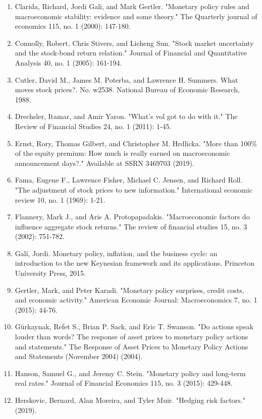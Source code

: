 \documentclass[12pt]{article}
\begin{document}
\begin{enumerate}
    \item{Clarida, Richard, Jordi Gali, and Mark Gertler. "Monetary policy rules and macroeconomic stability: evidence and some theory." The Quarterly journal of economics 115, no. 1 (2000): 147-180.}
    \item{Connolly, Robert, Chris Stivers, and Licheng Sun. "Stock market uncertainty and the stock-bond return relation." Journal of Financial and Quantitative Analysis 40, no. 1 (2005): 161-194.}
    \item{Cutler, David M., James M. Poterba, and Lawrence H. Summers. What moves stock prices?. No. w2538. National Bureau of Economic Research, 1988.}
    \item{Drechsler, Itamar, and Amir Yaron. "What's vol got to do with it." The Review of Financial Studies 24, no. 1 (2011): 1-45.}
    \item{Ernst, Rory, Thomas Gilbert, and Christopher M. Hrdlicka. "More than 100\% of the equity premium: How much is really earned on macroeconomic announcement days?." Available at SSRN 3469703 (2019).}
    \item{Fama, Eugene F., Lawrence Fisher, Michael C. Jensen, and Richard Roll. "The adjustment of stock prices to new information." International economic review 10, no. 1 (1969): 1-21.}
    \item{Flannery, Mark J., and Aris A. Protopapadakis. "Macroeconomic factors do influence aggregate stock returns." The review of financial studies 15, no. 3 (2002): 751-782.}
    \item{Galí, Jordi. Monetary policy, inflation, and the business cycle: an introduction to the new Keynesian framework and its applications. Princeton University Press, 2015.}
    \item{Gertler, Mark, and Peter Karadi. "Monetary policy surprises, credit costs, and economic activity." American Economic Journal: Macroeconomics 7, no. 1 (2015): 44-76.}
    \item{Gürkaynak, Refet S., Brian P. Sack, and Eric T. Swanson. "Do actions speak louder than words? The response of asset prices to monetary policy actions and statements." The Response of Asset Prices to Monetary Policy Actions and Statements (November 2004) (2004).}
    \item{Hanson, Samuel G., and Jeremy C. Stein. "Monetary policy and long-term real rates." Journal of Financial Economics 115, no. 3 (2015): 429-448.}
    \item{Herskovic, Bernard, Alan Moreira, and Tyler Muir. "Hedging risk factors." (2019).}

\end{enumerate}
\end{document}
